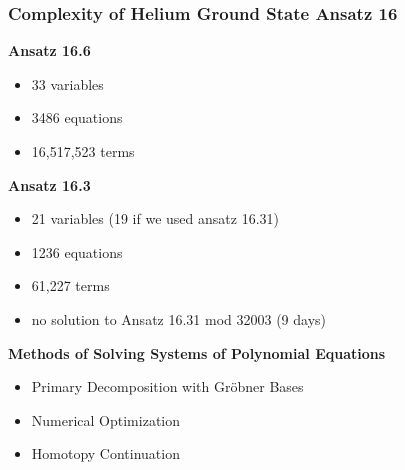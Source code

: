 \documentclass{beamer}
\begin{document}
\begin{frame}
\frametitle{Complexity of Helium Ground State Ansatz 16}
\begin{center}
\bf
Ansatz 16.6
\end{center}
\begin{itemize}
\item 33 variables
\item 3486 equations
\item 16,517,523 terms
\end{itemize}

\vskip 20pt

\begin{center}
\bf
Ansatz 16.3
\end{center}
\begin{itemize}
\item 21 variables (19 if we used ansatz 16.31)
\item 1236 equations
\item 61,227 terms
\item no solution to Ansatz 16.31 mod 32003 (9 days)
\end{itemize}

\vskip 20pt

\begin{center}
\bf
Methods of Solving Systems of Polynomial Equations
\end{center}

\begin{itemize}
\item Primary Decomposition with Gr\"obner Bases
\item Numerical Optimization
\item Homotopy Continuation
\end{itemize}
\end{frame}

\end{document}
